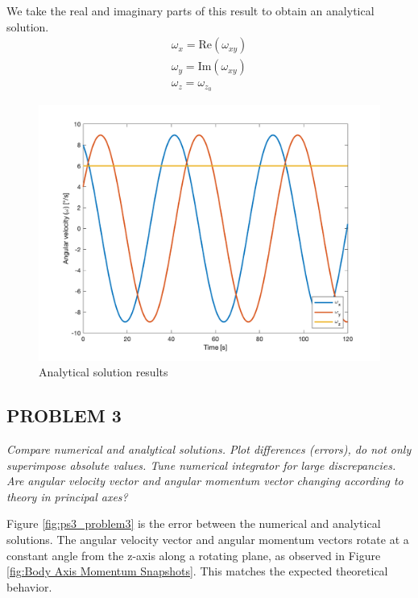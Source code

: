We take the real and imaginary parts of this result to obtain an analytical solution.
\begin{align*}
    \omega_x = \text{Re}(\omega_{xy}) \\
    \omega_y = \text{Im}(\omega_{xy}) \\ 
    \omega_z = \omega_{z_{0}}
\end{align*}


\begin{figure}[H]
\centering
\includegraphics[scale=0.6]{Images/ps3_problem2.png}
\caption{Analytical solution results}
\label{fig:ps3_problem2}
\end{figure}


\subsection{PROBLEM 3}
\textit{Compare numerical and analytical solutions. Plot differences (errors), do not only superimpose absolute values. Tune numerical integrator for large discrepancies. Are angular velocity vector and angular momentum vector changing according to theory in principal axes?}

Figure \ref{fig:ps3_problem3} is the error between the numerical and analytical solutions. The angular velocity vector and angular momentum vectors rotate at a constant angle from the z-axis along a rotating plane, as observed in Figure \ref{fig:Body Axis Momentum Snapshots}. This matches the expected theoretical behavior.

